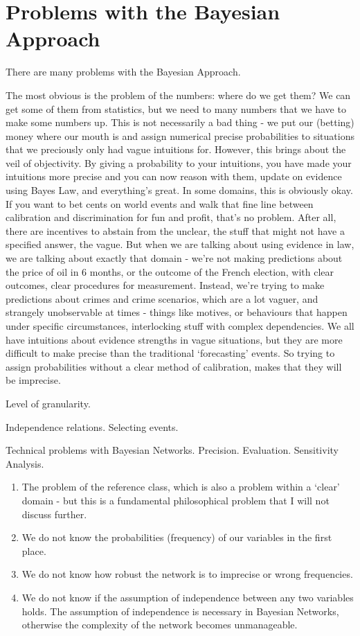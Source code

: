 \section{Problems with the Bayesian Approach}
There are many problems with the Bayesian Approach.

The most obvious is the problem of the numbers: where do we get them? We can get some of them from statistics, but we need to many numbers that we have to make some numbers up. This is not necessarily a bad thing - we put our (betting) money where our mouth is and assign numerical precise probabilities to situations that we preciously only had vague intuitions for. However, this brings about the veil of objectivity. By giving a probability to your intuitions, you have made your intuitions more precise and you can now reason with them, update on evidence using Bayes Law, and everything's great. In some domains, this is obviously okay. If you want to bet cents on world events and walk that fine line between calibration and discrimination for fun and profit, that's no problem.  After all, there are incentives to abstain from the unclear, the stuff that might not have a specified answer, the vague. But when we are talking about using evidence in law, we are talking about exactly that domain - we're not making predictions about the price of oil in 6 months, or the outcome of the French election, with clear outcomes, clear procedures for measurement. Instead, we're trying to make predictions about crimes and crime scenarios, which are a lot vaguer, and strangely unobservable at times - things like motives, or behaviours that happen under specific circumstances, interlocking stuff with complex dependencies. We all have intuitions about evidence strengths in vague situations, but they are more difficult to make precise than the traditional `forecasting' events. So trying to assign probabilities without a clear method of calibration, makes that they will be imprecise.

Level of granularity.

Independence relations. Selecting events.

Technical problems with Bayesian Networks. Precision. Evaluation. Sensitivity Analysis.

\begin{enumerate}
\item The problem of the reference class, which is also a problem within a `clear' domain - but this is a fundamental philosophical problem that I will not discuss further.
\item We do not know the probabilities (frequency) of our variables in the first place.
\item We do not know how robust the network is to imprecise or wrong frequencies.
\item We do not know if the assumption of independence between any two variables holds. The assumption of independence is necessary in Bayesian Networks, otherwise the complexity of the network becomes unmanageable.
\end{enumerate}


